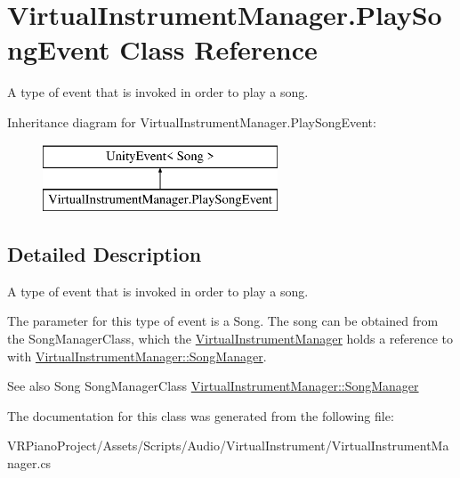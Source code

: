 \hypertarget{class_virtual_instrument_manager_1_1_play_song_event}{}\section{Virtual\+Instrument\+Manager.\+Play\+Song\+Event Class Reference}
\label{class_virtual_instrument_manager_1_1_play_song_event}


A type of event that is invoked in order to play a song.  


Inheritance diagram for Virtual\+Instrument\+Manager.\+Play\+Song\+Event\+:\begin{figure}[H]
\begin{center}
\leavevmode
\includegraphics[height=2.000000cm]{class_virtual_instrument_manager_1_1_play_song_event}
\end{center}
\end{figure}


\subsection{Detailed Description}
A type of event that is invoked in order to play a song. 

The parameter for this type of event is a Song. The song can be obtained from the Song\+Manager\+Class, which the \hyperlink{class_virtual_instrument_manager}{Virtual\+Instrument\+Manager} holds a reference to with \hyperlink{class_virtual_instrument_manager_a33dae94932c10c66db76a0eebec76b01}{Virtual\+Instrument\+Manager\+::\+Song\+Manager}.

\begin{DoxySeeAlso}{See also}
Song Song\+Manager\+Class \hyperlink{class_virtual_instrument_manager_a33dae94932c10c66db76a0eebec76b01}{Virtual\+Instrument\+Manager\+::\+Song\+Manager} 
\end{DoxySeeAlso}


The documentation for this class was generated from the following file\+:\begin{DoxyCompactItemize}
\item 
V\+R\+Piano\+Project/\+Assets/\+Scripts/\+Audio/\+Virtual\+Instrument/Virtual\+Instrument\+Manager.\+cs\end{DoxyCompactItemize}
